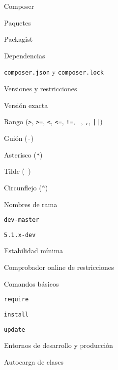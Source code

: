 \begin{longenum}
\begin{longenum}
        \item Composer
        \begin{longenum}
            \item Paquetes
            \item Packagist
            \item Dependencias
            \begin{longenum}
                \item \texttt{composer.json} y \texttt{composer.lock}
            \end{longenum}
            \item Versiones y restricciones
            \begin{longenum}
                \item Versión exacta
                \item Rango (\texttt{>}, \texttt{>=}, \texttt{<}, \texttt{<=}, \texttt{!=}, \texttt{ }, \texttt{,}, \texttt{||})
                \item Guión (\texttt{-})
                \item Asterisco (\texttt{*})
                \item Tilde (\texttt{~})
                \item Circunflejo (\texttt{\^})
                \item Nombres de rama
                \begin{longenum}
                    \item \texttt{dev-master}
                    \item \texttt{5.1.x-dev}
                \end{longenum}
                \item Estabilidad mínima
                \item Comprobador online de restricciones
            \end{longenum}
            \item Comandos básicos
            \begin{longenum}
                \item \texttt{require}
                \item \texttt{install}
                \item \texttt{update}
            \end{longenum}
            \item Entornos de desarrollo y producción
        \end{longenum}
        \item Autocarga de clases

\end{longenum}
\end{longenum}
